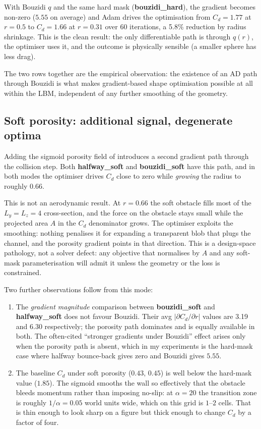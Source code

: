 \documentclass[10pt,twocolumn]{article}
\begin{document}
With Bouzidi $q$ and the same hard mask (\textbf{bouzidi\_hard}), the
gradient becomes non-zero ($5.55$ on average) and Adam drives the
optimisation from $C_d = 1.77$ at $r = 0.5$ to $C_d = 1.66$ at $r =
0.31$ over 60 iterations, a 5.8\% reduction by radius shrinkage. This
is the clean result: the only differentiable path is through $q(r)$,
the optimiser uses it, and the outcome is physically sensible (a
smaller sphere has less drag).

The two rows together are the empirical observation: the existence
of an AD path through Bouzidi is what makes gradient-based shape
optimisation possible at all within the LBM, independent of any
further smoothing of the geometry.

\subsection{Soft porosity: additional signal, degenerate optima}
\label{sec:optim_soft}

Adding the sigmoid porosity field of  introduces a
second gradient path through the collision step. Both
\textbf{halfway\_soft} and \textbf{bouzidi\_soft} have this path, and
in both modes the optimiser drives $C_d$ close to zero while
\emph{growing} the radius to roughly $0.66$.

This is not an aerodynamic result. At $r = 0.66$ the soft obstacle
fills most of the $L_y = L_z = 4$ cross-section, and the force on
the obstacle stays small while the projected area $A$ in the $C_d$
denominator grows. The optimiser exploits the smoothing: nothing
penalises it for expanding a transparent blob that plugs the
channel, and the porosity gradient points in that direction. This
is a design-space pathology, not a solver defect: any objective that
normalises by $A$ and any soft-mask parameterisation will admit it
unless the geometry or the loss is constrained.

Two further observations follow from this mode:
%
\begin{enumerate}\setlength\itemsep{0pt}
    \item The \emph{gradient magnitude} comparison between
    \textbf{bouzidi\_soft} and \textbf{halfway\_soft} does not favour
    Bouzidi. Their avg $|\partial C_d / \partial r|$ values are 3.19
    and 6.30 respectively; the porosity path dominates and is equally
    available in both. The often-cited ``stronger gradients under
    Bouzidi'' effect arises only when the porosity path is absent,
    which in my experiments is the hard-mask case where halfway
    bounce-back gives zero and Bouzidi gives $5.55$.
    \item The baseline $C_d$ under soft porosity ($0.43$, $0.45$) is
    well below the hard-mask value ($1.85$). The sigmoid smooths the
    wall so effectively that the obstacle bleeds momentum rather
    than imposing no-slip: at $\alpha = 20$ the transition zone is
    roughly $1/\alpha = 0.05$ world units wide, which on this grid is
    $1$--$2$ cells. That is thin enough to look sharp on a figure
    but thick enough to change $C_d$ by a factor of four.
\end{enumerate}
\end{document}

